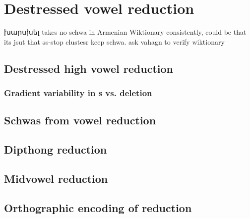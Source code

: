 
\chapter{Destressed vowel reduction}
խարսխել takes no schwa in Armenian Wiktionary consistently, could be that its jsut that əs-stop clustesr keep schwa. ask vahagn to verify wiktionary
\section{Destressed high vowel reduction}
\subsection{Gradient variability in s vs. deletion}
\section{Schwas from vowel reduction}
\section{Dipthong reduction}
\section{Midvowel reduction}
\section{Orthographic encoding of reduction}